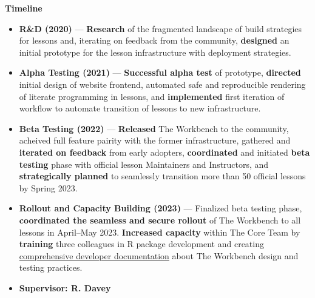 {\begin{itemize}
  \end{itemize}
  \textbf{Timeline}
  \begin{itemize}
    \item \textbf{R\&D (2020)} --- \textbf{Research} of the fragmented landscape of
      build strategies for lessons and, iterating on feedback from the
      community, \textbf{designed} an initial prototype for the lesson
      infrastructure with deployment strategies.
    \item \textbf{Alpha Testing (2021)} --- \textbf{Successful alpha test} of prototype,
      \textbf{directed} initial design of website frontend, automated safe and
      reproducible rendering of literate programming in lessons, and
      \textbf{implemented} first iteration of workflow to automate transition
      of lessons to new infrastructure.
    \item \textbf{Beta Testing (2022)} --- \textbf{Released} The Workbench to the community,
      acheived full feature pairity with the former infrastructure, gathered
      and \textbf{iterated on feedback} from early adopters,
      \textbf{coordinated} and initiated \textbf{beta testing} phase with official
      lesson Maintainers and Instructors, and \textbf{strategically planned} to
      seamlessly transition more than 50 official lessons by Spring 2023.
    \item \textbf{Rollout and Capacity Building (2023)} --- Finalized beta testing phase, \textbf{coordinated
      the seamless and secure rollout} of The Workbench to all lessons in
      April--May 2023. \textbf{Increased capacity} within The Core Team by
      \textbf{training} three colleagues in R package development and creating
      \href{https://carpentries.github.io/workbench-dev}{comprehensive
      developer documentation} about The Workbench design and testing
      practices.
    \item \textbf{Supervisor: R. Davey}
  \end{itemize}
}
